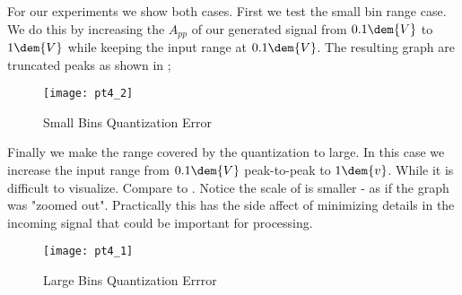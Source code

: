 \documentclass[main.tex]{subfile}
\begin{document}
For our experiments we show both cases. First we test the small bin range case.
We do this by increasing the $A_{pp}$ of our generated signal from $0.1\dem{V}$
to $1\dem{V}$ while keeping the input range at $0.1\dem{V}$. The resulting graph
are truncated peaks as shown in ;

\begin{figure}[H]
	\begin{center}
		\texttt{[image: pt4\_2]}
	\end{center}
	\caption{Small Bins Quantization Error}
	\label{fig:smallQ}
\end{figure}

Finally we make the range covered by the quantization to large. In this case we
increase the input range from $0.1\dem{V}$ peak-to-peak to $1\dem{v}$. While it
is difficult to visualize. Compare  to . Notice the
scale of  is smaller - as if the graph was "zoomed out".
Practically this has the side affect of minimizing details in the incoming
signal that could be important for processing. 

\begin{figure}[H]
	\begin{center}
		\texttt{[image: pt4\_1]}
	\end{center}
	\caption{Large Bins Quantization Errror}
	\label{fig:bigQ}
\end{figure}


\end{document}
